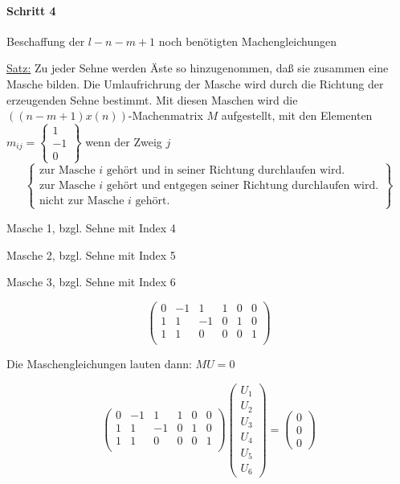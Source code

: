 \documentclass[german]{article}
\begin{document}
\paragraph{Schritt 4}
	Beschaffung der $l - n-m+1$ noch benötigten Machengleichungen

	\underline{Satz:} Zu jeder Sehne werden Äste so hinzugenommen, daß sie zusammen eine Masche bilden. Die Umlaufrichrung der Masche wird durch die Richtung der erzeugenden Sehne bestimmt. Mit diesen Maschen wird die $((n-m+1) x (n))$-Machenmatrix $M$ aufgestellt, mit den Elementen
	$m_{ij} = \left\{ \begin{array}{c} 1\\ -1\\ 0 \end{array} \right\}$ wenn der Zweig $j$
	\[
		\left\{
			\begin{array}{c}
				\text{zur Masche } i \text{ gehört und in seiner Richtung durchlaufen wird.}\\
				\text{zur Masche } i \text{ gehört und entgegen seiner Richtung durchlaufen wird.}\\
				\text{nicht zur Masche } i \text{ gehört.}
			\end{array}
		\right\}
	\]

	Masche 1, bzgl. Sehne mit Index 4


	Masche 2, bzgl. Sehne mit Index 5


	Masche 3, bzgl. Sehne mit Index 6

	\[
		\begin{pmatrix}
			0 & -1 & 1 & 1 & 0 & 0 \\
			1 & 1 & -1 & 0 & 1 & 0 \\
			1 & 1 & 0 & 0 & 0 & 1 \\
		\end{pmatrix}
	\]

	Die Maschengleichungen lauten dann: $MU = 0$

	\[
		\begin{pmatrix}
			0 & -1 & 1 & 1 & 0 & 0 \\
			1 & 1 & -1 & 0 & 1 & 0 \\
			1 & 1 & 0 & 0 & 0 & 1 \\
		\end{pmatrix}
		\begin{pmatrix}
			U_1 \\
			U_2 \\
			U_3 \\
			U_4 \\
			U_5 \\
			U_6
		\end{pmatrix}
		=
		\begin{pmatrix}
			0 \\
			0 \\
			0
		\end{pmatrix}
	\]
\end{document}
